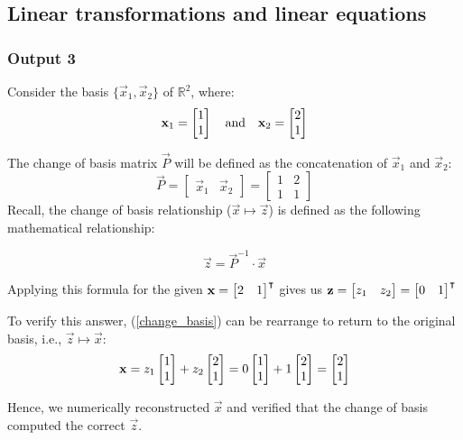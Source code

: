 \documentclass[10pt]{article}
\begin{document}
\subsection{Linear transformations and linear equations}
\subsubsection{Output 3}
Consider the basis $\{\vec{x}_1, \vec{x}_2\}$ of $\mathbb{R}^2$, where:
\begin{equation*}
    \mathbf{x}_1 = \begin{bmatrix} 1\\1 \end{bmatrix}
    \quad
    \text{and}
    \quad
    \mathbf{x}_2 = \begin{bmatrix} 2\\1 \end{bmatrix}
\end{equation*}

The change of basis matrix $\vec{P}$ will be defined as the concatenation of $\vec{x}_1$ and $\vec{x}_2$:
\begin{equation*}
    \vec{P} =
        \begin{bmatrix}
            \vec{x}_1 & \vec{x}_2
        \end{bmatrix} = 
        \begin{bmatrix}
            1 & 2\\1 & 1
        \end{bmatrix}
\end{equation*}
Recall, the change of basis relationship ($\vec{x} \mapsto \vec{z} $)  is defined as the following mathematical relationship:

\begin{equation} \label{change_basis}
    \vec{z} = \vec{P}^{-1} \cdot \vec{x}
\end{equation}

Applying this formula for the given $\mathbf{x} = \begin{bmatrix} 2 & 1 \end{bmatrix}^\intercal$ gives us $\mathbf{z} = \begin{bmatrix} z_1 & z_2 \end{bmatrix} = \begin{bmatrix} 0 & 1 \end{bmatrix}^\intercal$

To verify this answer, (\ref{change_basis}) can be rearrange to return to the original basis, i.e., $\vec{z} \mapsto \vec{x} $:
\begin{equation*}
    \mathbf{x} = z_1\begin{bmatrix} 1\\1 \end{bmatrix} + z_2\begin{bmatrix} 2\\1 \end{bmatrix} = 0\begin{bmatrix} 1\\1 \end{bmatrix} + 1\begin{bmatrix} 2\\1 \end{bmatrix} = \begin{bmatrix} 2\\1 \end{bmatrix}
\end{equation*}

Hence, we numerically reconstructed $\vec{x}$ and verified that the change of basis computed the correct $\vec{z}$.
\end{document}
